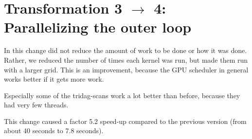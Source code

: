 \section{Transformation 3 $\rightarrow$ 4: Parallelizing the outer loop}

In this change did not reduce the amount of work to be done or how it
was done. Rather, we reduced the number of times each kernel was run, but made them run with a
larger grid. This is an improvement, because the GPU scheduler
in general works better if it gets more work.

Especially some of the tridag-scans work a lot better than before,
because they had very few threads.

This change caused a factor 5.2 speed-up compared to the previous version
(from about 40 seconds to 7.8 seconds).
